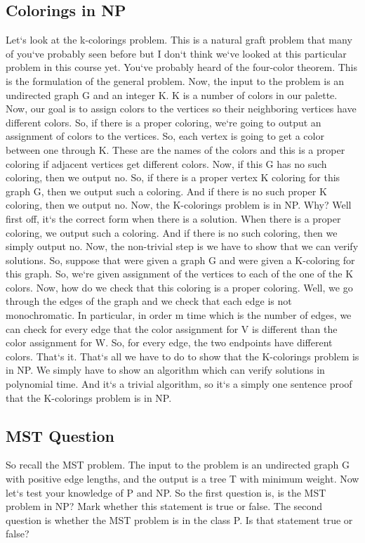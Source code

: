 \subsection{Colorings in NP}
Let`s look at the k-colorings problem.
This is a natural graft problem that many of you`ve probably seen before but I don`t think we`ve looked at this particular problem in this course yet.
You`ve probably heard of the four-color theorem.
This is the formulation of the general problem.
Now, the input to the problem is an undirected graph G and an integer K\@.
K is a number of colors in our palette.
Now, our goal is to assign colors to the vertices so their neighboring vertices have different colors.
So, if there is a proper coloring, we`re going to output an assignment of colors to the vertices.
So, each vertex is going to get a color between one through K\@.
These are the names of the colors and this is a proper coloring if adjacent vertices get different colors.
Now, if this G has no such coloring, then we output no.
So, if there is a proper vertex K coloring for this graph G, then we output such a coloring.
And if there is no such proper K coloring, then we output no.
Now, the K-colorings problem is in NP\@.
Why? Well first off, it`s the correct form when there is a solution.
When there is a proper coloring, we output such a coloring.
And if there is no such coloring, then we simply output no.
Now, the non-trivial step is we have to show that we can verify solutions.
So, suppose that were given a graph G and were given a K-coloring for this graph.
So, we`re given assignment of the vertices to each of the one of the K colors.
Now, how do we check that this coloring is a proper coloring.
Well, we go through the edges of the graph and we check that each edge is not monochromatic.
In particular, in order m time which is the number of edges, we can check for every edge that the color assignment for V is different than the color assignment for W\@.
So, for every edge, the two endpoints have different colors.
That`s it.
That`s all we have to do to show that the K-colorings problem is in NP\@.
We simply have to show an algorithm which can verify solutions in polynomial time.
And it`s a trivial algorithm, so it`s a simply one sentence proof that the K-colorings problem is in NP\@.

\subsection{MST Question}
So recall the MST problem.
The input to the problem is an undirected graph G with positive edge lengths, and the output is a tree T with minimum weight.
Now let`s test your knowledge of P and NP\@.
So the first question is, is the MST problem in NP? Mark whether this statement is true or false.
The second question is whether the MST problem is in the class P\@.
Is that statement true or false?

